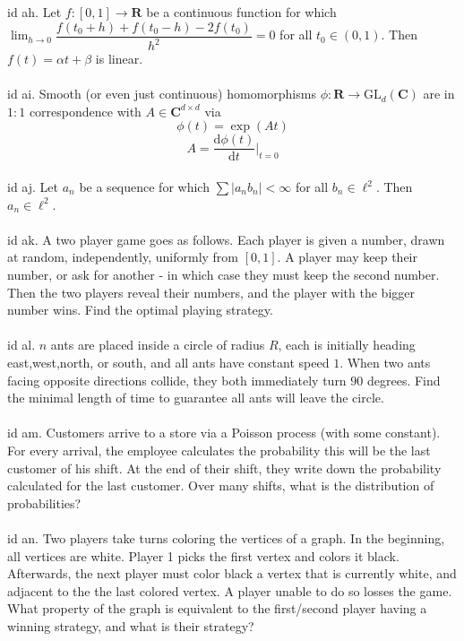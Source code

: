 \documentclass[oneside]{book}
\newcommand{\R}{\mathbf{R}}
\newcommand{\C}{\mathbf{C}}
\newcommand{\GL}{\mathrm{GL}}\newcommand{\SL}{\mathrm{SL}}
\renewcommand{\d}{\mathrm{d}}
\begin{document}
id ah. Let $f:[0,1]\to\R$ be a continuous function for which $\displaystyle\lim_{h\to0}\dfrac{f(t_0+h)+f(t_0-h)-2f(t_0)}{h^2}=0$ for all $t_0\in(0,1)$. Then $f(t)=\alpha t+\beta$ is linear.   \\\\


id ai. Smooth (or even just continuous) homomorphisms $\phi:\R\to\GL_d(\C)$ are in $1:1$ correspondence with $A\in\C^{d\times d}$ via $$\phi(t)=\exp(At)$$ $$A=\dfrac{\d \phi(t)}{\d t}\biggr\rvert_{t=0}$$ \\


id aj. Let $a_n$ be a sequence for which $\sum|a_nb_n|<\infty$ for all $b_n\in\ell^2$. Then $a_n\in\ell^2$.     \\\\


id ak. A two player game goes as follows. Each player is given a number, drawn at random, independently, uniformly from $[0,1]$. A player may keep their number, or ask for another - in which case they must keep the second number. Then the two players reveal their numbers, and the player with the bigger number wins. Find the optimal playing strategy.     \\\\


id al. $n$ ants are placed inside a circle of radius $R$, each is initially heading east,west,north, or south, and all ants have constant speed $1$. When two ants facing opposite directions collide, they both immediately turn $90$ degrees. Find the minimal length of time to guarantee all ants will leave the circle.        \\\\


id am. Customers arrive to a store via a Poisson process (with some constant). For every arrival, the employee calculates the probability this will be the last customer of his shift. At the end of their shift, they write down the probability calculated for the last customer. Over many shifts, what is the distribution of probabilities?    \\\\


id an. Two players take turns coloring the vertices of a graph. In the beginning, all vertices are white. Player 1 picks the first vertex and colors it black. Afterwards, the next player must color black a vertex that is currently white, and adjacent to the the last colored vertex. A player unable to do so losses the game. What property of the graph is equivalent to the first/second player having a winning strategy, and what is their strategy?     \\\\
\end{document}
